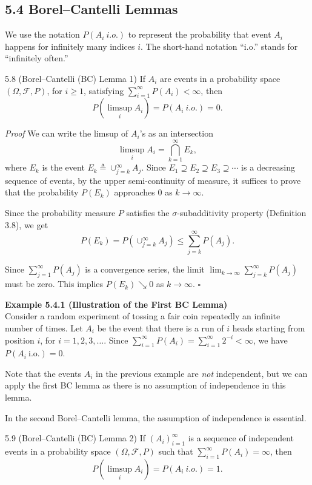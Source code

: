 \subsection*{5.4 Borel--Cantelli Lemmas}

We use the notation $P(A_i\ i.o.)$ to represent the probability that event $A_i$ happens for infinitely many indices $i$. The short-hand notation ``i.o.'' stands for ``infinitely often.''

\begin{thmbox}{5.8 (Borel--Cantelli (BC) Lemma 1)}
If $A_i$ are events in a probability space $(\Omega,\mathcal{F},P)$, for $i \ge 1$, satisfying $\sum_{i=1}^{\infty} P(A_i)<\infty$, then
\[
P(\limsup_i A_i)=P(A_i\ i.o.)=0.
\]
\end{thmbox}

\textit{Proof} We can write the limsup of $A_i$'s as an intersection
\[
\limsup_i A_i=\bigcap_{k=1}^{\infty} E_k,
\]
where $E_k$ is the event $E_k \triangleq \cup_{j=k}^{\infty} A_j$. Since $E_1 \supseteq E_2 \supseteq E_3 \supseteq \cdots$ is a decreasing sequence of events, by the upper semi-continuity of measure, it suffices to prove that the probability $P(E_k)$ approaches $0$ as $k \to \infty$.

Since the probability measure $P$ satisfies the $\sigma$-subadditivity property (Definition 3.8), we get
\[
P(E_k)=P\left(\cup_{j=k}^{\infty} A_j\right)\le \sum_{j=k}^{\infty} P(A_j).
\]

Since $\sum_{j=1}^{\infty} P(A_j)$ is a convergence series, the limit $\lim_{k \to \infty} \sum_{j=k}^{\infty} P(A_j)$ must be zero. This implies $P(E_k) \searrow 0$ as $k \to \infty$. \hfill $\square$

\textbf{Example 5.4.1 (Illustration of the First BC Lemma)} \\
Consider a random experiment of tossing a fair coin repeatedly an infinite number of times. Let $A_i$ be the event that there is a run of $i$ heads starting from position $i$, for $i=1,2,3,\ldots$. Since $\sum_{i=1}^{\infty} P(A_i)=\sum_{i=1}^{\infty} 2^{-i}<\infty$, we have $P(A_i\ \text{i.o.})=0$.

Note that the events $A_i$ in the previous example are \textit{not} independent, but we can apply the first BC lemma as there is no assumption of independence in this lemma.

In the second Borel--Cantelli lemma, the assumption of independence is essential.

\begin{thmbox}{5.9 (Borel--Cantelli (BC) Lemma 2)}
If $(A_i)_{i=1}^{\infty}$ is a sequence of independent events in a probability space $(\Omega,\mathcal{F},P)$ such that $\sum_{i=1}^{\infty} P(A_i)=\infty$, then
\[
P(\limsup_i A_i)=P(A_i\ i.o.)=1.
\]
\end{thmbox}

